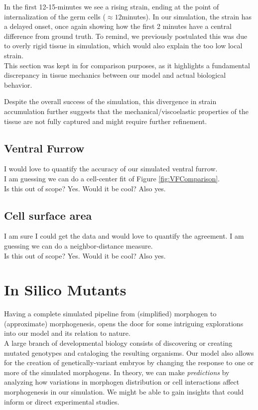 In the first 12-15-minutes we see a rising strain, ending at the point of internalization of the germ cells ($\approx12$minutes). In our simulation, the strain has a delayed onset, once again showing how the first 2 minutes have a central difference from ground truth. To remind, we previously postulated this was due to overly rigid tissue in simulation, which would also explain the too low local strain. \\

This section was kept in for comparison purposes, as it highlights a fundamental discrepancy in tissue mechanics between our model and actual biological behavior.  

Despite the overall success of the simulation, this divergence in strain accumulation further suggests that the mechanical/viscoelastic properties of the tissue are not fully captured and might require further refinement. 


\subsection{Ventral Furrow}
I would love to quantify the accuracy of our simulated ventral furrow.\\
I am guessing we can do a cell-center fit of Figure \ref{fig:VFComparison}.\\
Is this out of scope? Yes. Would it be cool? Also yes.

\subsection{Cell surface area}
I am sure I could get the data and would love to quantify the agreement.
I am guessing we can do a neighbor-distance measure.\\
Is this out of scope? Yes. Would it be cool? Also yes.
\newpage
\section{In Silico Mutants}
Having a complete simulated pipeline from (simplified) morphogen to (approximate) morphogenesis, opens the door for some intriguing explorations into our model and its relation to nature. \\


A large branch of developmental biology consists of discovering or creating mutated genotypes and cataloging the resulting organisms. 
Our model also allows for the creation of genetically-variant embryos by changing the response to one or more of the simulated morphogens. In theory, we can make \textit{predictions} by analyzing how variations in morphogen distribution or cell interactions affect morphogenesis in our simulation. We might be able to gain insights that could inform or direct experimental studies.\\

